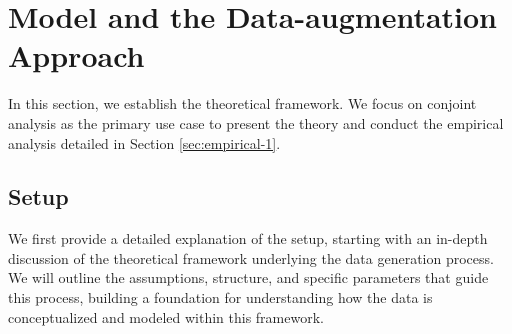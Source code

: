 \section{Model and the Data-augmentation Approach}
\label{sec:model}

In this section, we establish the theoretical framework. We focus on conjoint analysis as the primary use case to present the theory and conduct the empirical analysis detailed in Section \ref{sec:empirical-1}.

\subsection{Setup}
\label{sec:setup}

We first provide a detailed explanation of the setup, starting with an in-depth discussion of the theoretical framework underlying the data generation process. We will outline the assumptions, structure, and specific parameters that guide this process, building a foundation for understanding how the data is conceptualized and modeled within this framework.

